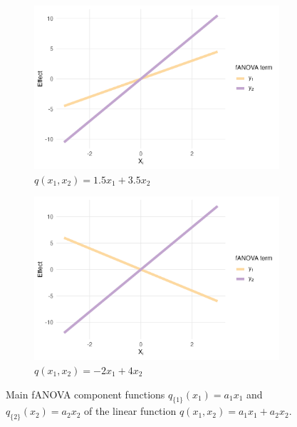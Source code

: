 \begin{figure}[htpb]
    \centering
    \begin{subfigure}[t]{0.49\textwidth}
        \centering
        \includegraphics[width=\textwidth]{images/experiment_section/linear_a1p15_a2p35_a11p00_a22p00_a12p00_rhop00_main.png}
        \caption{$q(x_1, x_2) = 1.5 x_1 + 3.5 x_2$}
    \end{subfigure}%
    \hfill
    \begin{subfigure}[t]{0.49\textwidth}
        \centering
        \includegraphics[width=\textwidth]{images/experiment_section/linear_a1m20_a2p40_a11p00_a22p00_a12p00_rhop00_main.png}
        \caption{$q(x_1, x_2) = -2 x_1 + 4 x_2$}
    \end{subfigure}
    \caption{Main fANOVA component functions $q_{\{1\}}(x_1) = a_1 x_1$ and $q_{\{2\}}(x_2) = a_2 x_2$ of the linear function $q(x_1,x_2)=a_1x_1+a_2x_2$.}
    \label{fig:linear_main_effects}
\end{figure}


